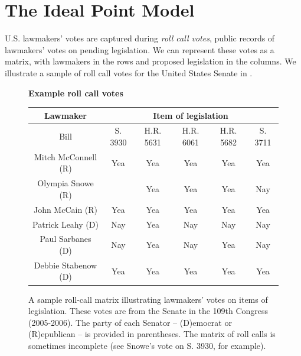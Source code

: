 \section{The Ideal Point Model}
\label{sec:model}


U.S. lawmakers' votes are captured during \textit{roll call votes}, public
records of lawmakers' votes on pending legislation.  We can represent
these votes as a matrix, with lawmakers in the rows and proposed
legislation in the columns.  We illustrate a sample of roll call votes
for the United States Senate in .
\begin{figure}[b]
  \center
  \textbf{Example roll call votes}
  \begin{tabular}{cccccc}
   \hline
   \hline
   \small Lawmaker & \multicolumn{5}{c}{\small Item of legislation} \\
   \hline
   \small Bill & \small  \small S. 3930 & \small  H.R. 5631 & \small  H.R. 6061 & \small  H.R. 5682 & \small  S. 3711 \\
   \small Mitch McConnell (R) & \small  \small Yea & \small  Yea & \small  Yea & \small  Yea & \small  Yea \\
   \small Olympia Snowe (R) & \small   & \small  Yea & \small  Yea & \small  Yea & \small  Nay \\
   \small John McCain (R) & \small  Yea & \small  Yea & \small  Yea & \small  Yea & \small  Yea \\
   \small Patrick Leahy (D) & \small  Nay & \small  Yea & \small  Nay & \small  Nay & \small  Nay \\
   \small Paul Sarbanes (D) & \small  Nay & \small  Yea & \small  Nay & \small  Yea & \small  Nay \\
   \small Debbie Stabenow (D) & \small  Yea & \small  Yea & \small  Yea & \small  Yea & \small  Yea \\
   \hline
 \end{tabular}
 \caption{A sample roll-call matrix illustrating lawmakers' votes on
   items of legislation.  These votes are from the Senate in the 109th
   Congress (2005-2006).  The party of each Senator -- (D)emocrat or
   (R)epublican -- is provided in parentheses. The matrix of roll
   calls is sometimes incomplete (see Snowe's vote on S. 3930, for
   example). }
  \label{fig:roll_call_table}
\end{figure}


